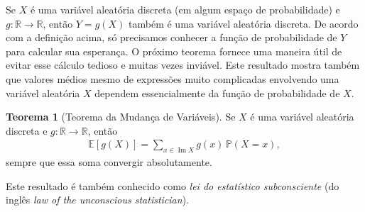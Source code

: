 \documentclass[12pt,portuguese]{article}
\theoremstyle{definition}
\newtheorem{theorem}{Teorema}
\begin{document}
Se \(X\) é uma variável aleatória discreta (em algum espaço de probabilidade)
e \(g : \mathbb{R} \to \mathbb{R}\), então \(Y = g(X)\) também é uma variável
aleatória discreta. De acordo com a definição acima, só precisamos conhecer a
função de probabilidade de \(Y\) para calcular sua esperança. O próximo
teorema fornece uma maneira útil de evitar esse cálculo tedioso e muitas vezes inviável.
Este resultado mostra também que valores médios mesmo de expressões muito complicadas envolvendo uma variável aleatória
$X$ dependem essencialmente da função de probabilidade de $X$.   

\begin{theorem}[Teorema da Mudança de Variáveis]\label{thm:lotus}
Se \(X\) é uma variável aleatória discreta e \(g : \mathbb{R} \to \mathbb{R}\),
então
\begin{align}\label{eq-teo-mud-var}
\mathbb{E}[g(X)] = \sum_{x \in \operatorname{Im} X} g(x) \, \mathbb{P}(X = x),
\end{align}
sempre que essa soma convergir absolutamente.
\end{theorem}

Este resultado é também conhecido como \emph{lei do estatístico subconsciente}
(do inglês \emph{law of the unconscious statistician}).
\end{document}
